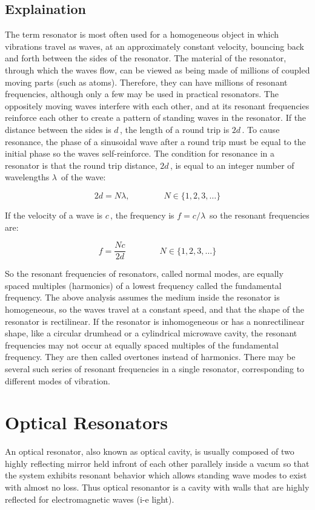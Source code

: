 \subsection{Explaination}
The term resonator is most often used for a homogeneous object in which vibrations travel as waves, at an approximately constant velocity, bouncing back and forth between the sides of the resonator. The material of the resonator, through which the waves flow, can be viewed as being made of millions of coupled moving parts (such as atoms). Therefore, they can have millions of resonant frequencies, although only a few may be used in practical resonators. The oppositely moving waves interfere with each other, and at its resonant frequencies reinforce each other to create a pattern of standing waves in the resonator. If the distance between the sides is ${\displaystyle d\,}$, the length of a round trip is ${\displaystyle 2d\,}$. To cause resonance, the phase of a sinusoidal wave after a round trip must be equal to the initial phase so the waves self-reinforce. The condition for resonance in a resonator is that the round trip distance, ${\displaystyle 2d\,}$, is equal to an integer number of wavelengths ${\displaystyle \lambda \,}$ of the wave:

$${\displaystyle 2d=N\lambda ,\qquad \qquad N\in \{1,2,3,\dots \}}$$

If the velocity of a wave is ${\displaystyle c\,}$, the frequency is ${\displaystyle f=c/\lambda \,}$ so the resonant frequencies are:

$${\displaystyle f={\frac {Nc}{2d}}\qquad \qquad N\in \{1,2,3,\dots \}}$$

So the resonant frequencies of resonators, called normal modes, are equally spaced multiples (harmonics) of a lowest frequency called the fundamental frequency. The above analysis assumes the medium inside the resonator is homogeneous, so the waves travel at a constant speed, and that the shape of the resonator is rectilinear. If the resonator is inhomogeneous or has a nonrectilinear shape, like a circular drumhead or a cylindrical microwave cavity, the resonant frequencies may not occur at equally spaced multiples of the fundamental frequency. They are then called overtones instead of harmonics. There may be several such series of resonant frequencies in a single resonator, corresponding to different modes of vibration.

\section{Optical Resonators}
An optical resonator, also known as optical cavity, is usually composed of two highly reflecting mirror held infront of each other parallely inside a vacum so that the system exhibits resonant behavior which allows standing wave modes to exist with almost no loss. Thus optical resonantor is a cavity with walls that are highly reflected for electromagnetic waves (i-e light).


